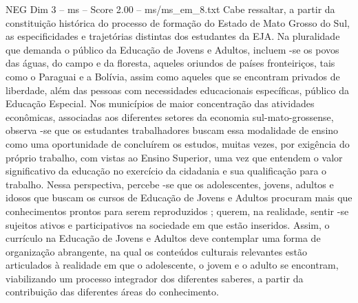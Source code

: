 \begin{textsample}{NEG Dim 3 – ms – Score 2.00 – ms/ms\_em\_8.txt}
Cabe ressaltar, a partir da constituição histórica do processo de formação do Estado de Mato Grosso do Sul, as especificidades e trajetórias distintas dos estudantes da EJA.
Na pluralidade que demanda o público da Educação de Jovens e Adultos, incluem -se os povos das águas, do campo e da floresta, aqueles oriundos de países fronteiriços, tais como o Paraguai e a Bolívia, assim como aqueles que se encontram privados de liberdade, além das pessoas com necessidades educacionais específicas, público da Educação Especial.
Nos municípios de maior concentração das atividades econômicas, associadas aos diferentes setores da economia sul-mato-grossense, observa -se que os estudantes trabalhadores buscam essa modalidade de ensino como uma oportunidade de concluírem os estudos, muitas vezes, por exigência do próprio trabalho, com vistas ao Ensino Superior, uma vez que entendem o valor significativo da educação no exercício da cidadania e sua qualificação para o trabalho.
Nessa perspectiva, percebe -se que os adolescentes, jovens, adultos e idosos que buscam os cursos de Educação de Jovens e Adultos procuram mais que conhecimentos prontos para serem reproduzidos ; querem, na realidade, sentir -se sujeitos ativos e participativos na sociedade em que estão inseridos.
Assim, o currículo na Educação de Jovens e Adultos deve contemplar uma forma de organização abrangente, na qual os conteúdos culturais relevantes estão articulados à realidade em que o adolescente, o jovem e o adulto se encontram, viabilizando um processo integrador dos diferentes saberes, a partir da contribuição das diferentes áreas do conhecimento.

\end{textsample}
